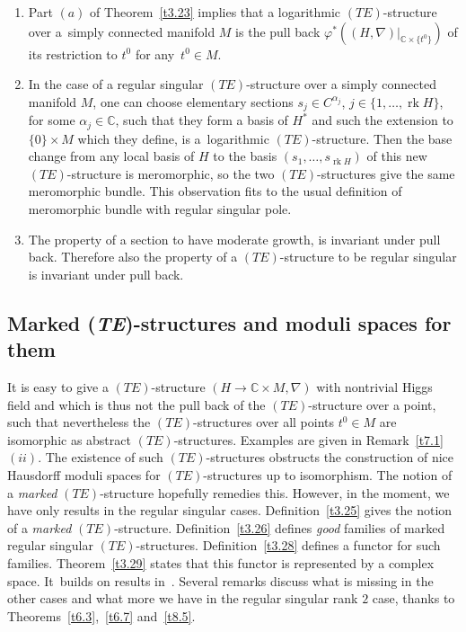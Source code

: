 \documentclass[pdftex]{sigma}%
\numberwithin{equation}{section}
\numberwithin{figure}{section}
\newcommand{\C}{{\mathbb C}}
\newcommand{\nnn}{\nabla}
\DeclareMathOperator{\rk}{rk}
\begin{document}
\begin{Remarks}\quad%
\begin{enumerate}\itemsep=0pt
\item[$(i)$] Part $(a)$ of Theorem~\ref{t3.23} implies that a
logarithmic $(TE)$-structure over a~simply connected
manifold $M$ is the pull back $\varphi^*((H,\nnn)|_{\C\times \{t^0\}})$
of its restriction to $t^0$ for any~$t^0\in M$.

\item[$(ii)$] In the case of a regular singular $(TE)$-structure
over a simply connected manifold $M$, one can choose
elementary sections $s_j\in C^{\alpha_j}$, $j\in\{1,\dots ,\rk H\}$,
for some $\alpha_j\in\C$, such that they form a basis of $H^*$
and such the extension to $\{0\}\times M$ which they define,
is a~logarithmic $(TE)$-structure.
Then the base change from any local basis of $H$ to the basis
$(s_1,\dots ,s_{\rk H})$ of this new $(TE)$-structure is meromorphic,
so the two $(TE)$-structures give the same meromorphic bundle.
This observation fits to the usual definition of meromorphic
bundle with regular singular pole.

\item[$(iii)$] The property of a section to have moderate growth,
is invariant under pull back. Therefore also the property
of a $(TE)$-structure to be regular singular is invariant
under pull back.
\end{enumerate}
\end{Remarks}



\subsection{Marked (\emph{TE})-structures and moduli spaces for them}


It is easy to give a $(TE)$-structure $(H\to\C\times M,\nnn)$
with nontrivial Higgs field and which is thus not the
pull back of the $(TE)$-structure over a point, such that
nevertheless the $(TE)$-structures over all points
$t^0\in M$ are isomorphic as abstract $(TE)$-structures.
Examples are given in Remark~\ref{t7.1}$(ii)$.
The existence of such $(TE)$-structures
obstructs the construction of nice Hausdorff
moduli spaces for $(TE)$-structures up to isomorphism.
The notion of a {\it marked} $(TE)$-structure hopefully
remedies this. However, in the moment, we have only results
in the regular singular cases.
Definition~\ref{t3.25} gives the notion of a {\it marked}
$(TE)$-structure. Definition~\ref{t3.26} defines {\it good}
families of marked regular singular $(TE)$-structures.
Definition~\ref{t3.28} defines a functor for such families.
Theorem~\ref{t3.29} states that this functor is represented
by a complex space. It~builds on results in~\cite[Chapter~7]{HS10}.
Several remarks discuss what is missing in the other cases
and what more we have in the regular singular rank $2$ case,
thanks to Theorems~\ref{t6.3},~\ref{t6.7} and~\ref{t8.5}.
\end{document}
